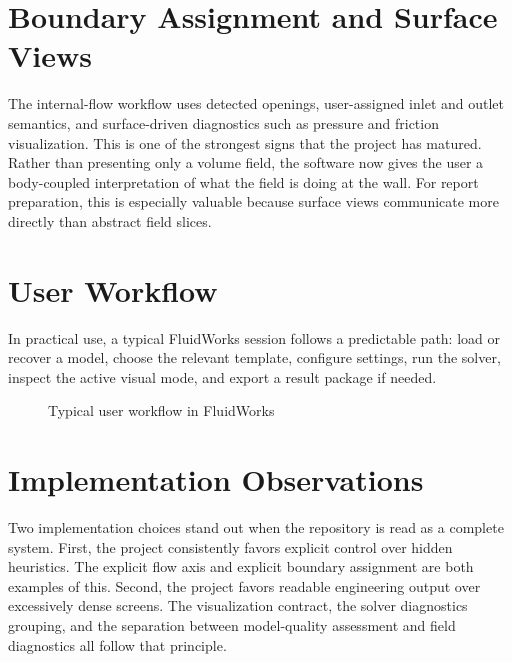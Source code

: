 \documentclass[12pt,a4paper,titlepage]{report}
\begin{document}
\section{Boundary Assignment and Surface Views}
The internal-flow workflow uses detected openings, user-assigned inlet and outlet semantics, and surface-driven diagnostics such as pressure and friction visualization. This is one of the strongest signs that the project has matured. Rather than presenting only a volume field, the software now gives the user a body-coupled interpretation of what the field is doing at the wall. For report preparation, this is especially valuable because surface views communicate more directly than abstract field slices.

\section{User Workflow}
In practical use, a typical FluidWorks session follows a predictable path: load or recover a model, choose the relevant template, configure settings, run the solver, inspect the active visual mode, and export a result package if needed.

\begin{figure}[H]
\centering
{}
\caption{Typical user workflow in FluidWorks}
\label{fig:userworkflow}
\end{figure}

\section{Implementation Observations}
Two implementation choices stand out when the repository is read as a complete system. First, the project consistently favors explicit control over hidden heuristics. The explicit flow axis and explicit boundary assignment are both examples of this. Second, the project favors readable engineering output over excessively dense screens. The visualization contract, the solver diagnostics grouping, and the separation between model-quality assessment and field diagnostics all follow that principle.
\end{document}
